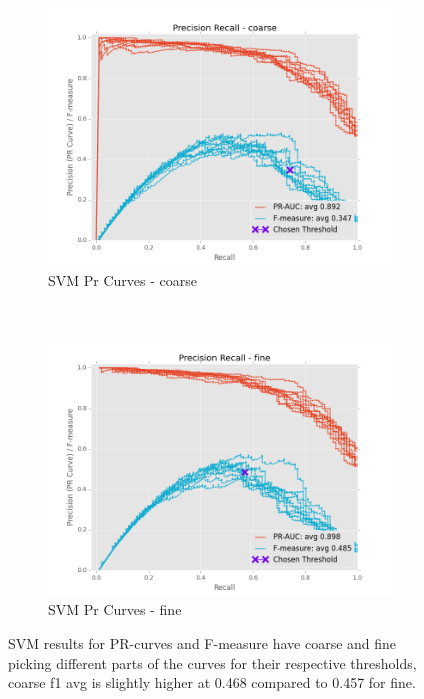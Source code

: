 \documentclass[ms]{nuthesis}
\begin{document}
\FloatBarrier
\begin{figure}[!htb]
    \centering
    \begin{subfigure}[t]{0.5\textwidth}
        \centering
        \includegraphics[width=\textwidth]{fig/SVM_FindThreshold_PrCurve_coarse}
        \caption{SVM Pr Curves - coarse}
    \end{subfigure}%
    ~
    \begin{subfigure}[t]{0.5\textwidth}
        \centering
        \includegraphics[width=\textwidth]{fig/SVM_FindThreshold_PrCurve_fine}
        \caption{SVM Pr Curves - fine}
    \end{subfigure}
    \caption{SVM results for PR-curves and F-measure have coarse and fine picking
    different parts of the curves for their respective thresholds, coarse f1 avg is
    slightly higher at 0.468 compared to 0.457 for fine.}
\end{figure}
\FloatBarrier
\end{document}
